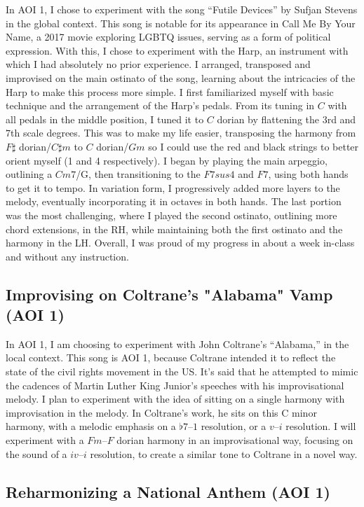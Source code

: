 \documentclass[12pt]{article}
\begin{document}
In AOI 1, I chose to experiment with the song “Futile Devices” by Sufjan Stevens in the global context. This song is notable for its appearance in Call Me By Your Name, a 2017 movie exploring LGBTQ issues, serving as a form of political expression. With this, I chose to experiment with the Harp, an instrument with which I had absolutely no prior experience. I arranged, transposed and improvised on the main ostinato of the song, learning about the intricacies of the Harp to make this process more simple. I first familiarized myself with basic technique and the arrangement of the Harp’s pedals. From its tuning in $C$ with all pedals in the middle position, I tuned it to $C$ dorian by flattening the $3$rd and $7$th scale degrees. This was to make my life easier, transposing the harmony from $F\sharp$ dorian/$C\sharp m$ to $C$ dorian/$Gm$ so I could use the red and black strings to better orient myself (1 and 4 respectively). I began by playing the main arpeggio, outlining a $Cm7$/G, then transitioning to the $F7sus4$ and $F7$, using both hands to get it to tempo. In variation form, I progressively added more layers to the melody, eventually incorporating it in octaves in both hands. The last portion was the most challenging, where I played the second ostinato, outlining more chord extensions, in the RH, while maintaining both the first ostinato and the harmony in the LH. Overall, I was proud of my progress in about a week in-class and without any instruction.


\subsection{Improvising on Coltrane's "Alabama" Vamp (AOI 1)}

In AOI 1, I am choosing to experiment with John Coltrane’s “Alabama,” in the local context. This song is AOI 1, because Coltrane intended it to reflect the state of the civil rights movement in the US. It’s said that he attempted to mimic the cadences of Martin Luther King Junior’s speeches with his improvisational melody. I plan to experiment with the idea of sitting on a single harmony with improvisation in the melody. In Coltrane’s work, he sits on this C minor harmony, with a melodic emphasis on a $\flat7–1$ resolution, or a $v–i$ resolution. I will experiment with a $Fm–F$ dorian harmony in an improvisational way, focusing on the sound of a $iv–i$ resolution, to create a similar tone to Coltrane in a novel way.

\subsection{Reharmonizing a National Anthem (AOI 1)}
\end{document}
